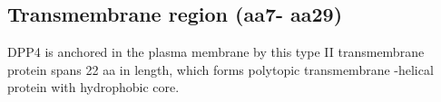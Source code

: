 \subsection{Transmembrane region (aa7- aa29)}


DPP4 is anchored in the plasma membrane by this type II transmembrane protein spans 22 aa in length, which forms polytopic transmembrane \alpha-helical protein with hydrophobic core.~\cite{Hong_1990}
